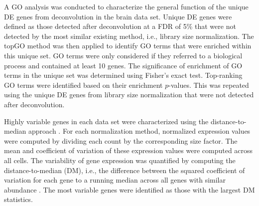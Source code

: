 \documentclass{bmcart}
\begin{document}

A GO analysis was conducted to characterize the general function of the unique DE genes from deconvolution in the brain data set.
Unique DE genes were defined as those detected after deconvolution at a FDR of 5\% that were not detected by the most similar existing method, i.e., library size normalization.
The topGO method \cite{alexa2010topgo} was then applied to identify GO terms that were enriched within this unique set.
GO terms were only considered if they referred to a biological process and contained at least 10 genes.
The significance of enrichment of GO terms in the unique set was determined using Fisher's exact test.
Top-ranking GO terms were identified based on their enrichment $p$-values.
This was repeated using the unique DE genes from library size normalization that were not detected after deconvolution.

Highly variable genes in each data set were characterized using the distance-to-median approach \cite{kolod2015single}.
For each normalization method, normalized expression values were computed by dividing each count by the corresponding size factor.
The mean and coefficient of variation of these expression values were computed across all cells.
The variability of gene expression was quantified by computing the distance-to-median (DM), i.e., the difference between the squared coefficient of variation for each gene to a running median across all genes with similar abundance \cite{kolod2015single}. 
The most variable genes were identified as those with the largest DM statistics.

\end{document}
